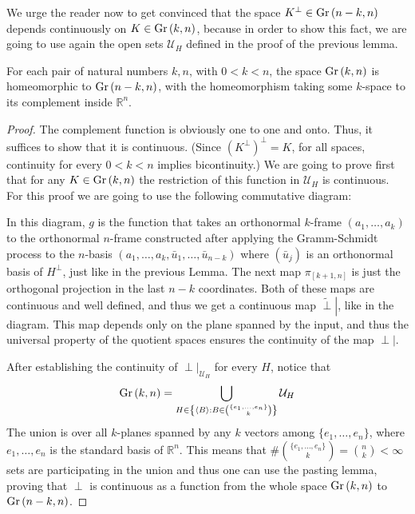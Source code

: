 We urge the reader now to get convinced that the space $K^{\perp}\in\Gr{n-k}{n}$ depends continuously on $K\in\Gr{k}{n}$, because in order to show this fact, we are going to use again the open sets $\mathcal{U}_H$ defined in the proof of the previous lemma.

\begin{lemma} For each pair of natural numbers $k,n$, with $0<k<n$, the space $\Gr{k}{n}$ is homeomorphic to $\Gr{n-k}{n}$, with the homeomorphism taking some $k$-space to its complement inside $\mathbb{R}^n$.
\end{lemma}

\begin{proof} The complement function is obviously one to one and onto. Thus, it suffices to show that it is continuous. (Since $\left(K^{\perp}\right)^{\perp}=K$, for all spaces, continuity for every $0<k<n$ implies bicontinuity.) We are going to prove first that for any $K\in\Gr{k}{n}$ the restriction of this function in $\mathcal{U}_H$ is continuous. For this proof we are going to use the following commutative diagram:
\begin{center}
\end{center}
In this diagram, $g$ is the function that takes an orthonormal $k$-frame $(a_1,\ldots,a_k)$ to the orthonormal $n$-frame constructed after applying the Gramm-Schmidt process to the $n$-basis $\left(a_1,\ldots,a_k,\bar{u}_1,\ldots,\bar{u}_{n-k}\right)$ where $\left(\bar{u}_j\right)$ is an orthonormal basis of $H^{\perp}$, just like in the previous Lemma. The next map $\pi_{[k+1,n]}$ is just the orthogonal projection in the last $n-k$ coordinates. Both of these maps are continuous and well defined, and thus we get a continuous map $\left.\tilde{\perp}\right|$, like in the diagram. This map depends only on the plane spanned by the input, and thus the universal property of the quotient spaces ensures the continuity of the map $\left.\perp\right|$.

After establishing the continuity of $\left.\perp\right|_{\mathcal{U}_H}$ for every $H$, notice that
$$\Gr{k}{n} = \bigcup_{H\in\left\{\left<B\right>:B\in\binom{\{e_1,\ldots,e_n\}}{k}\right\}}\mathcal{U}_H$$
The union is over all $k$-planes spanned by any $k$ vectors among $\{e_1,\ldots,e_n\}$, where $e_1,\ldots,e_n$ is the standard basis of $\mathbb{R}^n$. This means that $\#\binom{\{e_1,\ldots,e_n\}}{k}=\binom{n}{k}<\infty$ sets are participating in the union and thus one can use the pasting lemma, proving that $\perp$ is continuous as a function from the whole space $\Gr{k}{n}$ to $\Gr{n-k}{n}$.
\end{proof} 

